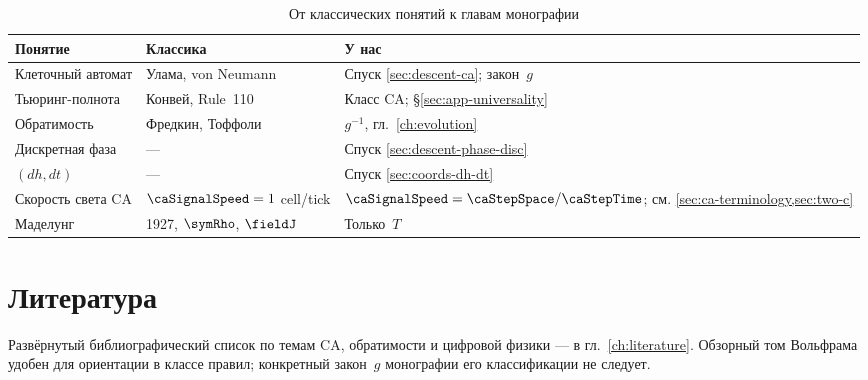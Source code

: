 \begin{table}[ht]
\centering
\caption{От классических понятий к главам монографии}
\label{tab:app-map}
\small
\begin{tabular}{@{}p{3.2cm}p{4.2cm}p{5.8cm}@{}}
\toprule
Понятие & Классика & У нас \\
\midrule
Клеточный автомат & Улама, von Neumann & Спуск \cref{sec:descent-ca}; закон~$g$ \\
Тьюринг-полнота & Конвей, Rule~110 & Класс CA; \S\ref{sec:app-universality} \\
Обратимость & Фредкин, Тоффоли & $g^{-1}$, гл.~\ref{ch:evolution} \\
Дискретная фаза & --- & Спуск \cref{sec:descent-phase-disc} \\
$(dh,dt)$ & --- & Спуск \cref{sec:coords-dh-dt} \\
Скорость света CA & $\caSignalSpeed=1$ cell/tick & $\caSignalSpeed=\caStepSpace/\caStepTime$; см. \cref{sec:ca-terminology,sec:two-c} \\
Маделунг & 1927, $\symRho$, $\fieldJ$ & Только~$T$ \\
\bottomrule
\end{tabular}
\end{table}

\section{Литература}

Развёрнутый библиографический список по темам CA, обратимости и цифровой физики ---
в гл.\ \ref{ch:literature}.
Обзорный том Вольфрама \cite{wolfram2002} удобен для ориентации в классе правил;
конкретный закон~$g$ монографии его классификации не следует.
